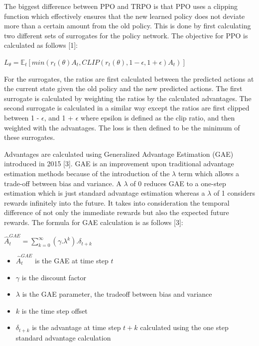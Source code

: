 \documentclass{article}
\begin{document}
	The biggest difference between PPO and TRPO is that PPO uses a clipping function which effectively ensures that the new learned policy does not deviate more than a certain amount from the old policy. This is done by first calculating two different sets of surrogates for the policy network. The objective for PPO is calculated as follows [1]:
	
	\begin{center}
		$L_{\theta} = \mathbb{E}_{t}[min(r_{t}({\theta})A_{t}, CLIP(r_{t}({\theta}), 1-\epsilon, 1+\epsilon)A_{t})]$
	\end{center}
	
	For the surrogates, the ratios are first calculated between the predicted actions at the current state given the old policy and the new predicted actions. The first surrogate is calculated by weighting the ratios by the calculated advantages. The second surrogate is calculated in a similar way except the ratios are first clipped between 1 - $\epsilon$, and 1 + $\epsilon$ where epsilon is defined as the clip ratio, and then weighted with the advantages. The loss is then defined to be the minimum of these surrogates.
	
	Advantages are calculated using Generalized Advantage Estimation (GAE) introduced in 2015 [3]. GAE is an improvement upon traditional advantage estimation methods because of the introduction of the $\lambda$ term which allows a trade-off between bias and variance. A $\lambda$ of 0 reduces GAE to a one-step estimation which is just standard advantage estimation whereas a $\lambda$ of 1 considers rewards infinitely into the future. It takes into consideration the temporal difference of not only the immediate rewards but also the expected future rewards. The formula for GAE calculation is as follows [3]:
	
	\begin{center}
		$\hat{A}^{GAE}_{t} = \sum_{k=0}^{\infty}(\gamma.\lambda^{k}).\delta_{t+k}$
	\end{center}
	\begin{itemize}
		\item $\hat{A}^{GAE}_{t}$ is the GAE at time step $t$
		\item $\gamma$ is the discount factor
		\item $\lambda$ is the GAE parameter, the tradeoff between bias and variance
		\item $k$ is the time step offset
		\item $\delta_{t+k}$ is the advantage at time step $t+k$ calculated using the one step standard advantage calculation
	\end{itemize}
	
\end{document}
